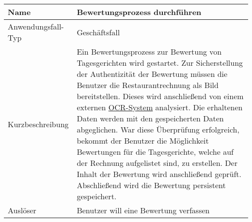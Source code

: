 \begin{table}[H]
    \centering
    \label{bewertungsprozessDurchfuehren}
    \begin{tabularx}{\textwidth}{| l | X |}
        \hline
        Name               & Bewertungsprozess durchführen                                                                                                                                                                                                                                                                                                                                                                                                                                                                                                                                                                                       \\
        \hline
        Anwendungsfall-Typ & Geschäftsfall                                                                                                                                                                                                                                                                                                                                                                                                                                                                                                                                                                                                       \\
        \hline
        Kurzbeschreibung   & Ein Bewertungsprozess zur Bewertung von Tagesgerichten wird gestartet. Zur Sicherstellung der Authentizität der Bewertung müssen die Benutzer die Restaurantrechnung als Bild bereitstellen. Dieses wird anschließend von einem externen \hyperref[gls:ocr-System]{OCR-System} analysiert. Die erhaltenen Daten werden mit den gespeicherten Daten abgeglichen. War diese Überprüfung erfolgreich, bekommt der Benutzer die Möglichkeit Bewertungen für die Tagesgerichte, welche auf der Rechnung aufgelistet sind, zu erstellen. Der Inhalt der Bewertung wird anschließend geprüft. Abschließend wird die Bewertung persistent gespeichert. \\
        \hline
        Auslöser           & Benutzer will eine Bewertung verfassen                                                                                                                                                                                                                                                                                                                                                                                                                                                                                                                                                                              \\

\end{tabularx}
\end{table}
